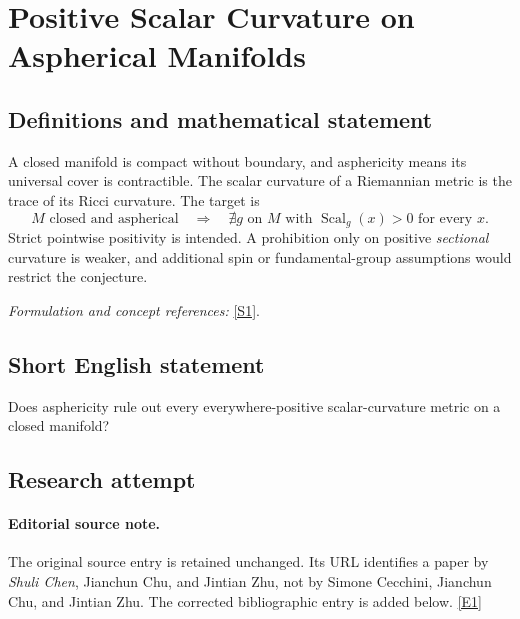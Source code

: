 \documentclass[11pt,a4paper]{article}
\newcommand{\sref}[2]{\hyperlink{source:#1:#2}{[S#2]}}
\newcommand{\eref}[2]{\hyperlink{extra:#1:#2}{[E#2]}}
\newif\ifshowcatalogue
\newcommand{\cataloguescope}[1]{\ifshowcatalogue
 \paragraph{Exact scope in the supplied catalogue.}
 \begin{quote}\small #1\end{quote}\fi}
\numberwithin{equation}{section}
\begin{document}
\setcounter{section}{0}
\setlength{\parskip}{3pt plus 1pt}
\clearpage
\section*{\texorpdfstring{Positive Scalar Curvature on Aspherical Manifolds}{Positive Scalar Curvature on Aspherical Manifolds}}\label{30005870}
\subsection{Definitions and mathematical statement}
A closed manifold is compact without boundary, and asphericity means its universal cover is contractible. The scalar curvature of a Riemannian metric is the trace of its Ricci curvature. The target is
\[
 M\text{ closed and aspherical}\quad\Longrightarrow\quad
 \nexists g\text{ on }M\text{ with }\operatorname{Scal}_g(x)>0\text{ for every }x.
\]
Strict pointwise positivity is intended. A prohibition only on positive \emph{sectional} curvature is weaker, and additional spin or fundamental-group assumptions would restrict the conjecture.
\par\smallskip\textit{Formulation and concept references:} \sref{30005870}{1}.
\cataloguescope{Prove or disprove that no closed aspherical manifold admits a Riemannian metric of positive scalar curvature.}
\subsection{Short English statement}
Does asphericity rule out every everywhere-positive scalar-curvature metric on a closed manifold?
\subsection{Research attempt}

\paragraph{Editorial source note.}
The original source entry is retained unchanged.  Its URL identifies a
paper by \emph{Shuli Chen}, Jianchun Chu, and Jintian Zhu, not by Simone
Cecchini, Jianchun Chu, and Jintian Zhu.  The corrected bibliographic
entry is added below. \eref{30005870}{1}
\end{document}
